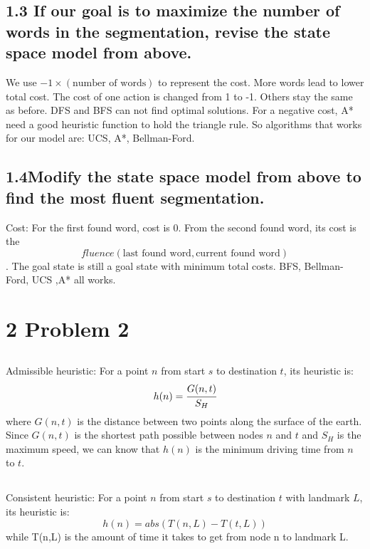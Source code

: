 \documentclass[12pt]{article}
\begin{document}
\subsection{1.3 If our goal is to maximize the number of words in the segmentation, revise the state space model from above.}
We use  $ - 1 \times (\text{number of words})$ to represent the cost. More words lead to
lower total cost. The cost of one action is changed from 1 to -1. Others stay the same as before. 
DFS and BFS  can not find optimal solutions. 
For a negative cost, A* need a good
heuristic function to hold the triangle rule. So algorithms that works for our model are: UCS, A*, Bellman-Ford.

\subsection{1.4Modify the state space model from above to find the
most fluent segmentation.}

Cost: 
For the first found word, cost is 0. From the second found word, its cost is
the $$fluence(\text{last found word}, \text{current found word}) $$. 
The goal state is still a goal state with minimum total costs. 
BFS, Bellman-Ford, UCS ,A* all works.




\section{2 Problem 2}

\subsection{}
Admissible heuristic:
For a point $n$ from start $s$ to destination $t$, its heuristic is:
\begin{equation}
   h(n) = \cfrac{G(n,t)}{S_H}
\end{equation}
where $G(n,t)$ is the distance between two points along the surface of the
earth. Since $G(n,t)$ is the shortest path possible between nodes $n$ and $t$ and
$S_H$ is the maximum speed, we can know that $h(n)$ is the minimum
driving time from $n$ to $t$.

\subsection{}
Consistent heuristic:
For a point $n$ from start $s$ to destination $t$ with landmark $L$, its heuristic is:
\begin{equation}
h(n) = abs(T(n,L) - T(t,L))
\end{equation}
while T(n,L) is the amount of time it takes to get from node n to landmark L.
\end{document}
